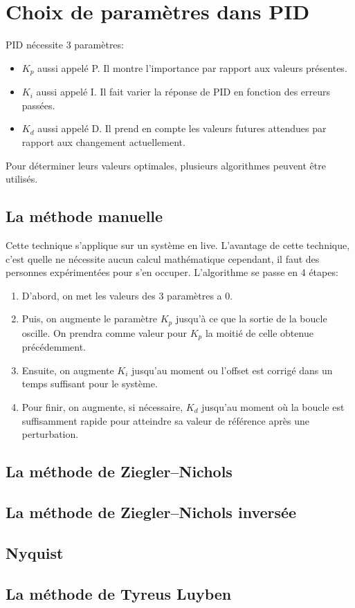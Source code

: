\section{Choix de paramètres dans PID}
PID nécessite 3 paramètres:
\begin{itemize}
	\item $K_p$ aussi appelé P. Il montre l'importance par rapport aux valeurs présentes.
	\item $K_i$ aussi appelé I. Il fait varier la réponse de PID en fonction des erreurs passées.
	\item $K_d$ aussi appelé D. Il prend en compte les valeurs futures attendues par rapport aux changement actuellement.
\end{itemize}
Pour déterminer leurs valeurs optimales, plusieurs algorithmes peuvent être utilisés.

\subsection{La méthode manuelle}
Cette technique s'applique sur un système en live. L'avantage de cette technique, c'est quelle ne nécessite aucun calcul mathématique cependant, il faut des personnes expérimentées pour s'en occuper.
L'algorithme se passe en 4 étapes:
\begin{enumerate}
	\item D'abord, on met les valeurs des 3 paramètres a 0.
	\item Puis, on augmente le paramètre $K_p$ jusqu'à ce que la sortie de la boucle oscille. On prendra comme valeur pour $K_p$ la moitié de celle obtenue précédemment.
	\item Ensuite, on augmente $K_i$ jusqu'au moment ou l'offset est corrigé dans un temps suffisant pour le système.
	\item Pour finir, on augmente, si nécessaire, $K_d$ jusqu'au moment où la boucle est suffisamment rapide pour atteindre sa valeur de référence après une perturbation.
\end{enumerate}

\subsection{La méthode de Ziegler–Nichols}

\subsection{La méthode de Ziegler–Nichols inversée}

\subsection{Nyquist} 

\subsection{La méthode de Tyreus Luyben}
